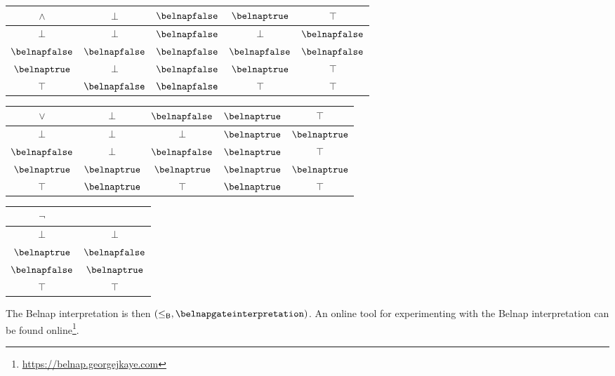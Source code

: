 \documentclass{lmcs}
\begin{document}
\begin{exa}
    \begin{center}
        \begin{tabular}{|c|cccc|}
            \hline
            \(\land\)        & \(\bot\)         & \(\belnapfalse\) & \(\belnaptrue\)  & \(\top\)         \\
            \hline
            \(\bot\)         & \(\bot\)         & \(\belnapfalse\) & \(\bot\)         & \(\belnapfalse\) \\
            \(\belnapfalse\) & \(\belnapfalse\) & \(\belnapfalse\) & \(\belnapfalse\) & \(\belnapfalse\) \\
            \(\belnaptrue\)  & \(\bot\)         & \(\belnapfalse\) & \(\belnaptrue\)  & \(\top\)         \\
            \(\top\)         & \(\belnapfalse\) & \(\belnapfalse\) & \(\top\)         & \(\top\)         \\
            \hline
        \end{tabular}
        \quad
        \begin{tabular}{|c|cccc|}
            \hline
            \(\lor\)         & \(\bot\)        & \(\belnapfalse\) & \(\belnaptrue\) & \(\top\)        \\
            \hline
            \(\bot\)         & \(\bot\)        & \(\bot\)         & \(\belnaptrue\) & \(\belnaptrue\) \\
            \(\belnapfalse\) & \(\bot\)        & \(\belnapfalse\) & \(\belnaptrue\) & \(\top\)        \\
            \(\belnaptrue\)  & \(\belnaptrue\) & \(\belnaptrue\)  & \(\belnaptrue\) & \(\belnaptrue\) \\
            \(\top\)         & \(\belnaptrue\) & \(\top\)         & \(\belnaptrue\) & \(\top\)        \\
            \hline
        \end{tabular}
        \quad
        \begin{tabular}{|c|c|}
            \hline
            \(\neg\)         &                  \\
            \hline
            \(\bot\)         & \(\bot\)         \\
            \(\belnaptrue\)  & \(\belnapfalse\) \\
            \(\belnapfalse\) & \(\belnaptrue\)  \\
            \(\top\)         & \(\top\)         \\
            \hline
        \end{tabular}
    \end{center}

    The Belnap interpretation is then \(
    (\leq_\mathsf{B}, \belnapgateinterpretation)
    \).
    An online tool for experimenting with the Belnap interpretation can be found
    online\footnote{\url{https://belnap.georgejkaye.com}}.
\end{exa}
\end{document}
